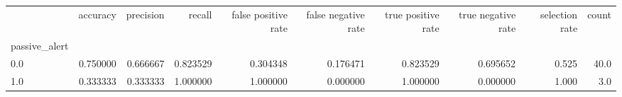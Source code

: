 \begin{tabular}{lrrrrrrrrr}
\toprule
{} &  accuracy &  precision &    recall &  false positive rate &  false negative rate &  true positive rate &  true negative rate &  selection rate &  count \\
passive\_alert &           &            &           &                      &                      &                     &                     &                 &        \\
\midrule
0.0           &  0.750000 &   0.666667 &  0.823529 &             0.304348 &             0.176471 &            0.823529 &            0.695652 &           0.525 &   40.0 \\
1.0           &  0.333333 &   0.333333 &  1.000000 &             1.000000 &             0.000000 &            1.000000 &            0.000000 &           1.000 &    3.0 \\
\bottomrule
\end{tabular}
